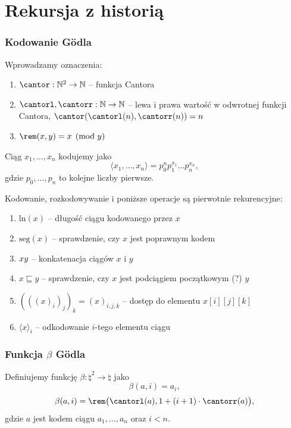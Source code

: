 \section{Rekursja z historią}
\subsubsection*{Kodowanie G\"odla}
Wprowadzamy oznaczenia:
\begin{enumerate}
    \item[] \( \cantor : \natural^2 \rightarrow \natural \) -- funkcja Cantora
    \item[] \( \cantorl, \cantorr : \natural \rightarrow \natural \) -- lewa i prawa wartość w odwrotnej funkcji Cantora, \( \cantor(\cantorl(n), \cantorr(n)) = n \)
    \item[] \( \rem(x, y) = x \pmod{y} \)
\end{enumerate}

Ciąg \( x_1, \ldots, x_n \) kodujemy jako 
\[ \langle x_1, \ldots, x_n \rangle = p_0^n p_1^{x_1} \ldots p_n^{x_n}, \]
gdzie \( p_0, \ldots, p_n \) to kolejne liczby pierwsze.

Kodowanie, rozkodowywanie i poniższe operacje są pierwotnie rekurencyjne:
\begin{enumerate}
    \item[] \( \text{ln}(x) \) -- długość ciągu kodowanego przez \( x \)
    \item[] \( \text{seg}(x) \) -- sprawdzenie, czy \( x \) jest poprawnym kodem
    \item[] \( x \* y \) -- konkatenacja ciągów \( x \) i \( y \)
    \item[] \( x \sqsubseteq y \) -- sprawdzenie, czy \( x \) jest podciągiem początkowym (?) \( y \)
    \item[] \( (((x)_i)_j)_k = (x)_{i, j, k} \) -- dostęp do elementu \( x[i][j][k] \)
    \item[] \( \langle x \rangle_i \) -- odkodowanie \( i \)-tego elementu ciągu
\end{enumerate}
    
\subsubsection*{Funkcja \( \beta \) G\"odla}
Definiujemy funkcję \( \beta : \natural^2 \rightarrow \natural \) jako
\[ \beta(a, i) = a_i, \]
\[ \beta(a, i) = \rem\big(\cantorl(a), 1 + (i + 1) \cdot \cantorr(a)\big), \]
gdzie \( a \) jest kodem ciągu \( a_1, \ldots, a_n \) oraz \( i < n \).

